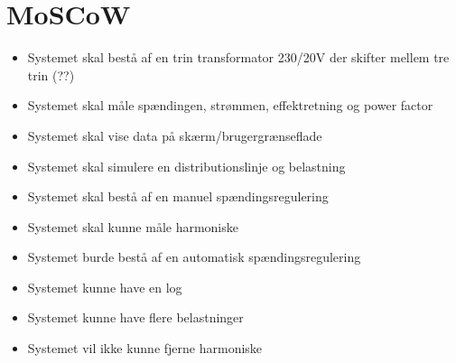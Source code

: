 
\section{MoSCoW}

\begin{itemize}
\item{Systemet skal bestå af en trin transformator 230/20V der skifter mellem tre trin (??)}
\item{Systemet skal måle spændingen, strømmen, effektretning og power factor}
\item{Systemet skal vise data på skærm/brugergrænseflade}
\item{Systemet skal simulere en distributionslinje og belastning}
\item{Systemet skal bestå af en manuel spændingsregulering}
\item{Systemet skal kunne måle harmoniske}
\item{Systemet burde bestå af en automatisk spændingsregulering}
\item{Systemet kunne have en log}
\item{Systemet kunne have flere belastninger}
\item{Systemet vil ikke kunne fjerne harmoniske} 
\end{itemize}

